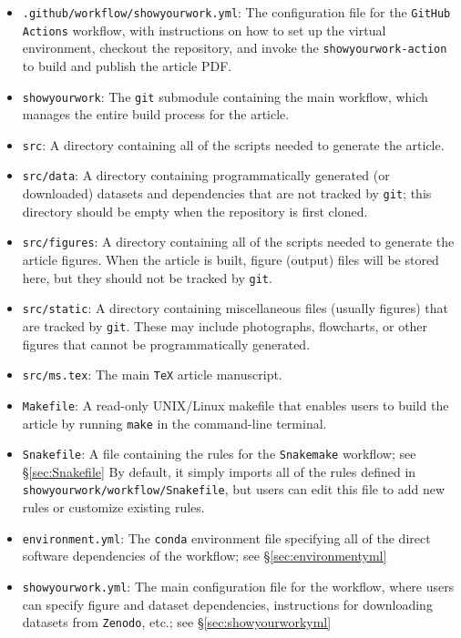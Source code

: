 \documentclass[twocolumn]{aastex631}
\begin{document}
\begin{itemize}
    \item \texttt{.github/workflow/showyourwork.yml}: The configuration file for the \texttt{GitHub Actions} workflow, with instructions on how to set up the virtual environment, checkout the repository, and invoke the \texttt{showyourwork-action} to build and publish the article PDF.
    \item \texttt{showyourwork}: The \texttt{git} submodule containing the main workflow, which manages the entire build process for the article.
    \item \texttt{src}: A directory containing all of the scripts needed to generate the article.
    \item \texttt{src/data}: A directory containing programmatically generated (or downloaded) datasets and dependencies that are not tracked by \texttt{git}; this directory should be empty when the repository is first cloned.
    \item \texttt{src/figures}: A directory containing all of the scripts needed to generate the article figures.
    When the article is built, figure (output) files will be stored here, but they should not be tracked by \texttt{git}.
    \item \texttt{src/static}: A directory containing miscellaneous files (usually figures) that are tracked by \texttt{git}.
    These may include photographs, flowcharts, or other figures that cannot be programmatically generated.
    \item \texttt{src/ms.tex}: The main \texttt{TeX} article manuscript.
    \item \texttt{Makefile}: A read-only UNIX/Linux makefile that enables users to build the article by running \texttt{make} in the command-line terminal.
    \item \texttt{Snakefile}: A file containing the rules for the \texttt{Snakemake} workflow; see \S\ref{sec:Snakefile}
    By default, it simply imports all of the rules defined in \texttt{showyourwork/workflow/Snakefile}, but users can edit this file to add new rules or customize existing rules.
    \item \texttt{environment.yml}: The \texttt{conda} environment file specifying all of the direct software dependencies of the workflow; see \S\ref{sec:environmentyml}
    \item \texttt{showyourwork.yml}: The main configuration file for the workflow, where users can specify figure and dataset dependencies, instructions for downloading datasets from \texttt{Zenodo}, etc.; see \S\ref{sec:showyourworkyml}
\end{itemize}
\end{document}

